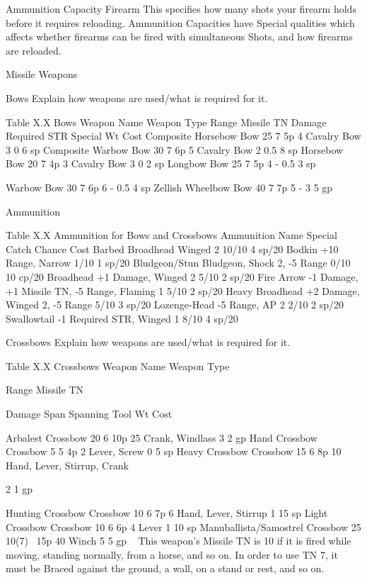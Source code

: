 \documentclass[oneside,11pt,english]{book}
\begin{document}
 

Ammunition Capacity 
Firearm 
This specifies how many shots your firearm holds before it requires reloading. Ammunition Capacities 
have Special qualities which affects whether firearms can be fired with simultaneous Shots, and how 
firearms are reloaded. 

 

Missile Weapons 

 

Bows 
Explain how weapons are used/what is required for it. 

 
Table X.X Bows 
Weapon Name Weapon Type Range Missile TN Damage Required STR Special Wt Cost 
Composite Horsebow Bow 25 7 5p 4 Cavalry Bow 3 0 6 sp 
Composite Warbow Bow 30 7 6p 5 Cavalry Bow 2 0.5 8 sp 
Horsebow Bow 20 7 4p 3 Cavalry Bow 3 0 2 sp 
Longbow Bow 25 7 5p 4 - 0.5 3 sp 


Warbow Bow 30 7 6p 6 - 0.5 4 sp 
Zellish Wheelbow Bow 40 7 7p 5 - 3 5 gp 

 
Ammunition 

 
Table X.X Ammunition for Bows and Crossbows 
Ammunition Name Special Catch Chance Cost 
Barbed Broadhead Winged 2 10/10 4 sp/20 
Bodkin +10 Range, Narrow 1/10 1 sp/20 
Bludgeon/Stun Bludgeon, Shock 2, -5 Range 0/10 10 cp/20 
Broadhead +1 Damage, Winged 2 5/10 2 sp/20 
Fire Arrow -1 Damage, +1 Missile TN, -5 Range, Flaming 1 5/10 2 sp/20 
Heavy Broadhead +2 Damage, Winged 2, -5 Range 5/10 3 sp/20 
Lozenge-Head -5 Range, AP 2 2/10 2 sp/20 
Swallowtail -1 Required STR, Winged 1 8/10 4 sp/20 

 

Crossbows 
Explain how weapons are used/what is required for it. 

 
Table X.X Crossbows 
Weapon Name Weapon 
Type 

Range Missile 
TN 

Damage Span Spanning Tool Wt Cost 

Arbalest Crossbow 20 6 10p 25 Crank, Windlass 3 2 gp 
Hand Crossbow Crossbow 5 5 4p 2 Lever, Screw 0 5 sp 
Heavy Crossbow Crossbow 15 6 8p 10 Hand, Lever, Stirrup, 
Crank 

2 1 gp 

Hunting Crossbow Crossbow 10 6 7p 6 Hand, Lever, Stirrup 1 15 
sp 
Light Crossbow Crossbow 10 6 6p 4 Lever 1 10 
sp 
Manuballista/Samostrel Crossbow 25 10(7)~ 15p 40 Winch 5 5 gp 
~ This weapon’s Missile TN is 10 if it is fired while moving, standing normally, from a horse, and so on. In order to use TN 7, it 
must be Braced against the ground, a wall, on a stand or rest, and so on. 
\end{document}
